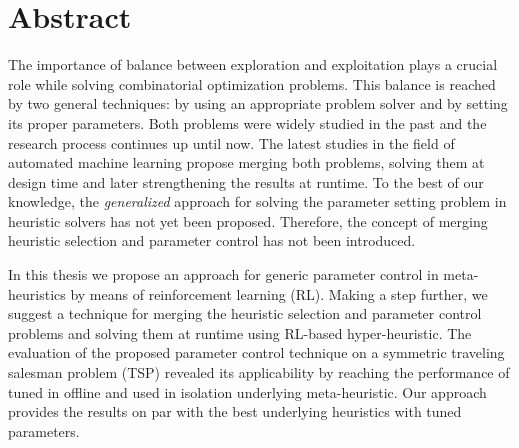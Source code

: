 \newpage
\section*{Abstract}
The importance of balance between exploration and exploitation plays a crucial role while solving combinatorial optimization problems. This balance is reached by two general techniques: by using an appropriate problem solver and by setting its proper parameters. Both problems were widely studied in the past and the research process continues up until now. The latest studies in the field of automated machine learning propose merging both problems, solving them at design time and later strengthening the results at runtime. To the best of our knowledge, the \emph{generalized} approach for solving the parameter setting problem in heuristic solvers has not yet been proposed. Therefore, the concept of merging heuristic selection and parameter control has not been introduced.

In this thesis we propose an approach for generic parameter control in meta-heuristics by means of reinforcement learning (RL). Making a step further, we suggest a technique for merging the heuristic selection and parameter control problems and solving them at runtime using RL-based hyper-heuristic. The evaluation of the proposed parameter control technique on a symmetric traveling salesman problem (TSP) revealed its applicability by reaching the performance of tuned in offline and used in isolation underlying meta-heuristic. Our approach provides the results on par with the best underlying heuristics with tuned parameters.